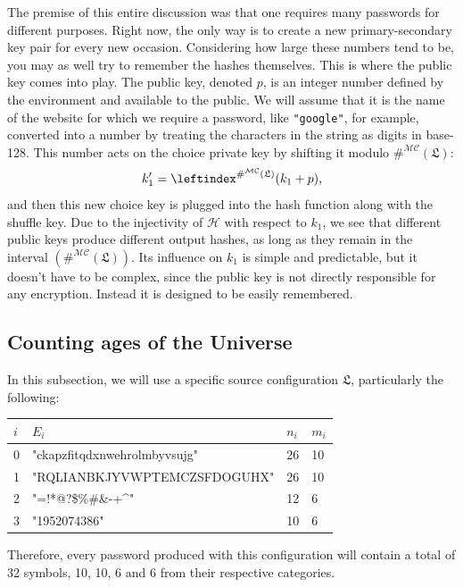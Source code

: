 \documentclass[12pt, a4paper]{article}
\renewcommand{\C}{\mathcal{C}}
\renewcommand{\H}{\mathcal{H}}
\newcommand{\M}{\mathcal{M}}
\newcommand{\conf}{\mathfrak{L}}
\newcommand{\lui}[1]{\leftindex^{#1}}
\begin{document}
The premise of this entire discussion was that one requires many passwords for different purposes. Right now, the only way is to create a new primary-secondary key pair for every new occasion. Considering how large these numbers tend to be, you may as well try to remember the hashes themselves. This is where the public key comes into play. The public key, denoted $ p $, is an integer number defined by the environment and available to the public. We will assume that it is the name of the website for which we require a password, like \texttt{"google"}, for example, converted into a number by treating the characters in the string as digits in base-128. This number acts on the choice private key by shifting it modulo $ \#^{\M\C}(\conf) $:
\[ k_1' = \lui{\#^{\M\C}(\conf)}(k_1 + p), \] 
and then this new choice key is plugged into the hash function along with the shuffle key. Due to the injectivity of $ \H $ with respect to $ k_1 $, we see that different public keys produce different output hashes, as long as they remain in the interval $ \left( \#^{\M\C}(\conf) \right) $. Its influence on $ k_1 $ is simple and predictable, but it doesn't have to be complex, since the public key is not directly responsible for any encryption. Instead it is designed to be easily remembered.

\subsection{Counting ages of the Universe}\label{bignum}

In this subsection, we will use a specific source configuration $ \conf $, particularly the following:

\begin{center}
\def\arraystretch{1.2}
\begin{tabular}{l|l|l|l}\ttfamily
    $ i $ & $ E_i $ & $ n_i $ & $ m_i $\\
    \hline
    0 & \ttfamily"ckapzfitqdxnwehrolmbyvsujg" & 26 & 10\\
    1 & \ttfamily"RQLIANBKJYVWPTEMCZSFDOGUHX" & 26 & 10\\
    2 & \ttfamily"=!*@?\$\%\#\&-+\^{}"        & 12 & 6\\
    3 & \ttfamily"1952074386"                 & 10 & 6\\
\end{tabular}
\end{center}

Therefore, every password produced with this configuration will contain a total of 32 symbols, 10, 10, 6 and 6 from their respective categories.
\end{document}
